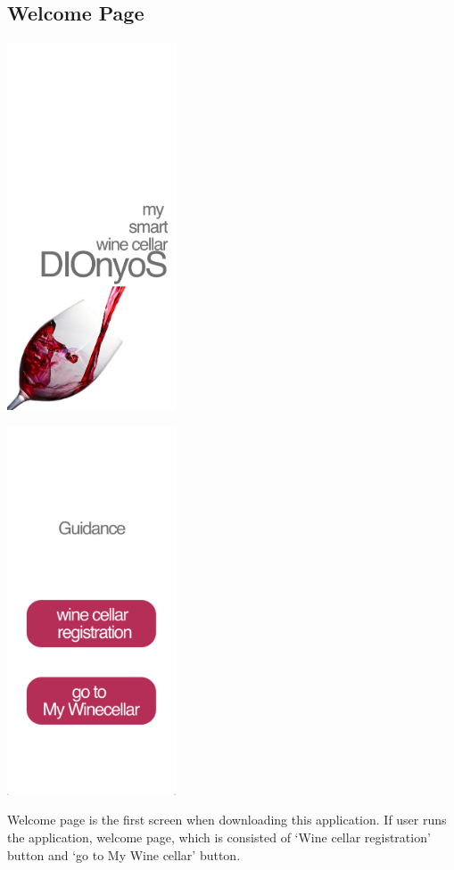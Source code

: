 \documentclass[conference]{IEEEtran}
\numberwithin{figure}{subsection}
\begin{document}
\subsection{Welcome Page}
\centerline{\includegraphics[width=5cm]{firstpage.png}}
\centerline{\includegraphics[width=5cm]{guidance.png}}
Welcome page is the first screen when downloading this application. If user runs the application, welcome page, which is consisted of ‘Wine cellar registration’ button and ‘go to My Wine cellar’ button.
\end{document}
